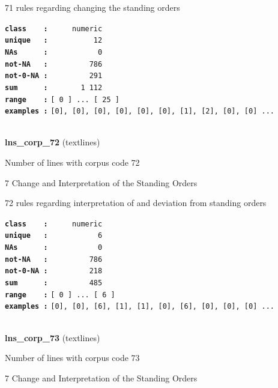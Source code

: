 \documentclass[]{article}
\begin{document}
71 rules regarding changing the standing orders

\textbf{\texttt{class\ \ \ \ :}} \texttt{~~~~~numeric}\\
\textbf{\texttt{unique\ \ \ :}} \texttt{~~~~~~~~~~12}\\
\textbf{\texttt{NAs\ \ \ \ \ \ :}} \texttt{~~~~~~~~~~~0}\\
\textbf{\texttt{not-NA\ \ \ :}} \texttt{~~~~~~~~~786}\\
\textbf{\texttt{not-0-NA\ :}} \texttt{~~~~~~~~~291}\\
\textbf{\texttt{sum\ \ \ \ \ \ :}} \texttt{~~~~~~~1~112}\\
\textbf{\texttt{range\ \ \ \ :}}
\texttt{{[}\ 0\ {]}\ ...\ {[}\ 25\ {]}}\\
\textbf{\texttt{examples\ :}}
\texttt{{[}0{]},\ {[}0{]},\ {[}0{]},\ {[}0{]},\ {[}0{]},\ {[}0{]},\ {[}1{]},\ {[}2{]},\ {[}0{]},\ {[}0{]}\ ...}\\

~

\textbf{lns\_corp\_72} (textlines)

Number of lines with corpus code 72

7 Change and Interpretation of the Standing Orders

72 rules regarding interpretation of and deviation from standing orders

\textbf{\texttt{class\ \ \ \ :}} \texttt{~~~~~numeric}\\
\textbf{\texttt{unique\ \ \ :}} \texttt{~~~~~~~~~~~6}\\
\textbf{\texttt{NAs\ \ \ \ \ \ :}} \texttt{~~~~~~~~~~~0}\\
\textbf{\texttt{not-NA\ \ \ :}} \texttt{~~~~~~~~~786}\\
\textbf{\texttt{not-0-NA\ :}} \texttt{~~~~~~~~~218}\\
\textbf{\texttt{sum\ \ \ \ \ \ :}} \texttt{~~~~~~~~~485}\\
\textbf{\texttt{range\ \ \ \ :}}
\texttt{{[}\ 0\ {]}\ ...\ {[}\ 6\ {]}}\\
\textbf{\texttt{examples\ :}}
\texttt{{[}0{]},\ {[}0{]},\ {[}6{]},\ {[}1{]},\ {[}1{]},\ {[}0{]},\ {[}6{]},\ {[}0{]},\ {[}0{]},\ {[}0{]}\ ...}\\

~

\textbf{lns\_corp\_73} (textlines)

Number of lines with corpus code 73

7 Change and Interpretation of the Standing Orders
\end{document}
